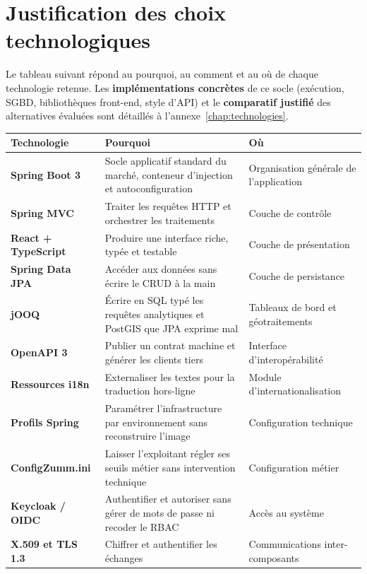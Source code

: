 \section{Justification des choix technologiques}
Le tableau suivant répond au pourquoi, au comment et au où de chaque technologie
retenue. Les \textbf{implémentations concrètes} de ce socle (exécution,
SGBD, bibliothèques front-end, style d'API) et le \textbf{comparatif justifié}
des alternatives évaluées sont détaillés à l'annexe~\ref{chap:technologies}.
\begin{xltabular}{\textwidth}{>{\bfseries}p{2.6cm} X p{5.4cm}}
\toprule
\textbf{Technologie} & \textbf{Pourquoi} & \textbf{Où} \\
\midrule
\endhead
Spring Boot 3 & Socle applicatif standard du marché, conteneur d'injection et autoconfiguration & Organisation générale de l'application \\
Spring MVC & Traiter les requêtes HTTP et orchestrer les traitements & Couche de contrôle \\
React + TypeScript & Produire une interface riche, typée et testable & Couche de présentation \\
Spring Data JPA & Accéder aux données sans écrire le CRUD à la main & Couche de persistance \\
jOOQ & Écrire en SQL typé les requêtes analytiques et PostGIS que JPA exprime mal & Tableaux de bord et géotraitements \\
OpenAPI 3 & Publier un contrat machine et générer les clients tiers & Interface d'interopérabilité \\
Ressources i18n & Externaliser les textes pour la traduction hors-ligne & Module d'internationalisation \\
Profils Spring & Paramétrer l'infrastructure par environnement sans reconstruire l'image & Configuration technique \\
ConfigZumm.ini & Laisser l'exploitant régler ses seuils métier sans intervention technique & Configuration métier \\
Keycloak / OIDC & Authentifier et autoriser sans gérer de mots de passe ni recoder le RBAC & Accès au système \\
X.509 et TLS 1.3 & Chiffrer et authentifier les échanges & Communications inter-composants \\
\bottomrule
\end{xltabular}

